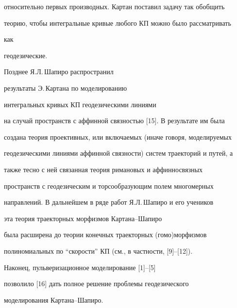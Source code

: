 относительно первых производных. Картан поставил задачу так обобщить 


теорию, чтобы интегральные кривые любого КП можно было рассматривать 


как 


геодезические. 


 


Позднее Я.Л.\,Шапиро распространил


результаты Э.\,Картана по моделированию 


интегральных кривых КП геодезическими линиями


на случай пространств с аффинной связностью [15]. В результате им была 


создана теория проективных, или включаемых (иначе говоря, моделируемых 


геодезическими линиями аффинной связности) систем траекторий и путей, а 


также тесно с ней связанная теория римановых и аффинносвязных 


пространств с геодезическим и торсообразующим полем многомерных 


направлений. В дальнейшем в ряде работ Я.Л.\,Шапиро и его учеников 


эта теория траекторных морфизмов Картана--Шапиро 


была расширена до теории конечных траекторных (гомо)морфизмов


полиномиальных по ``скорости'' КП (см., в частности, [9]--[12]).


Наконец, пульверизационное моделирование [1]--[5] 


позволило [16] дать полное решение проблемы геодезического 


моделирования Картана--Шапиро. 


 


 


